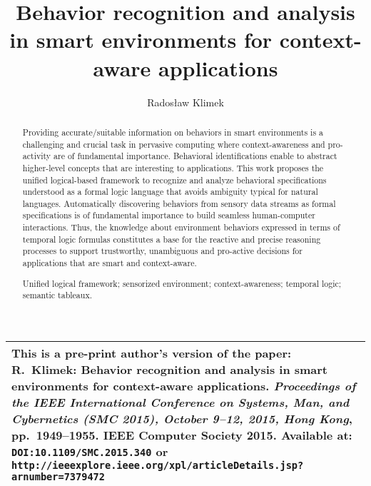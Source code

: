 \documentclass[runningheads,a4paper]{llncs}
\newcommand{\keywords}[1]{\par\addvspace\baselineskip
\noindent\keywordname\enspace\ignorespaces#1}
\begin{document}
\mainmatter  
\title{Behavior recognition and analysis in smart environments for context-aware applications}


\author{Rados{\l}aw Klimek}



\maketitle


\begin{abstract}
Providing accurate/suitable information on behaviors in sma\-rt environments is
a challenging and crucial task in pervasive computing
where context-awareness and pro-activity are of fundamental importance.
Behavioral identifications enable to abstract higher-level concepts that are interesting to applications.
This work proposes the unified logical-based framework to recognize and analyze behavioral specifications understood as
a formal logic language that avoids ambiguity typical for natural languages.
Automatically discovering behaviors from sensory data streams as formal specifications
is of fundamental importance to build seamless human-computer interactions.
Thus, the knowledge about environment behaviors expressed in terms of temporal logic formulas constitutes
a base for the reactive and precise reasoning processes to support trustworthy,
unambiguous and pro-active decisions for applications that are smart and context-aware.

\keywords{Unified logical framework;
sensorized environment;
context-awareness;
temporal logic;
semantic tableaux.}
\end{abstract}

\noindent
\begin{tabularx}{1\linewidth}{|X|}
\hline This is a pre-print author's version of the paper:
R.~Klimek: Behavior recognition and analysis in smart environments
for context-aware applications. \emph{Proceedings of the IEEE
International Conference on Systems, Man, and Cybernetics (SMC
2015), October 9--12, 2015, Hong Kong}, pp.\ 1949--1955. IEEE
Computer Society 2015. Available at:
\texttt{DOI:10.1109/SMC.2015.340} or
\texttt{http://ieeexplore.ieee.org/xpl/articleDetails.jsp?arnumber=7379472}\\
\hline
\end{tabularx}
\end{document}
